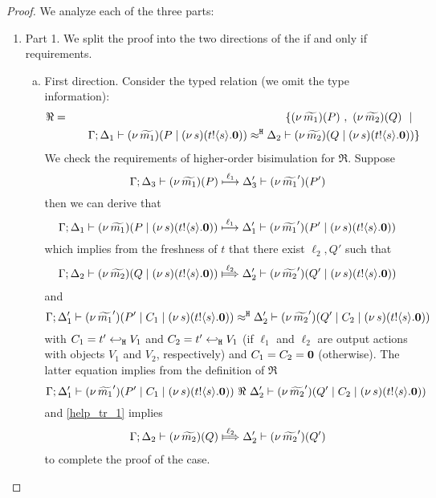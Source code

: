 \begin{proof}
We analyze each of the three parts:
\begin{enumerate}[$-$]
	\item Part 1. We split the proof into the two directions
	of the if and only if requirements.
	\begin{enumerate}[a)]
		\item	First direction. Consider the typed relation (we omit the type information):
				\begin{eqnarray*}
					\Re &=& \set{	\newsp{\widetilde{m_1}}{P}\ , \ 
									\newsp{\widetilde{m_2}}{Q} \setbar\\
					&&
									\quad \horel{\Gamma}{\Delta_1}{\newsp{\widetilde{m_1}}{P \Par \newsp{s}{\bout{t}{s} \inact}  } }
									{\hwb}
									{\Delta_2}{\newsp{\widetilde{m_2}}{Q \Par \newsp{s}{\bout{t}{s} \inact}  } }
					}
				\end{eqnarray*}
				We check the requirements of higher-order bisimulation
				for  $\Re$.
				Suppose
				\[
					\Gamma; \Delta_3 \vdash (\nu\, \widetilde{m_1})(P   )  \stackrel{\ell_1}{\longmapsto} \Delta_3' \vdash (\nu\, \widetilde{m_1}')(P')
				\]
				then we can derive that
				\[
					\Gamma; \Delta_1 \vdash (\nu\, \widetilde{m_1})(P \;|\; (\nu\, s)(t ! \langle s \rangle . \mathbf{0})  )  \stackrel{\ell_1}{\longmapsto} \Delta_1' \vdash (\nu\, \widetilde{m_1}')(P' \;|\; (\nu\, s)(t ! \langle s \rangle . \mathbf{0})  )
				\]
				which implies from the freshness of $t$ that there exist $\ell_2, Q'$ such that
				\begin{eqnarray}
					\horel{\Gamma}{\Delta_2}{\newsp{\widetilde{m_2}}{Q \Par \newsp{s}{\bout{t}{s} \inact}  } }
					{\Hby{\ell_2}}
					{\Delta_2'}{\newsp{\widetilde{m_2}'}{Q' \Par \newsp{s}{\bout{t}{s} \inact}  } }
					\label{help_tr_1}
				\end{eqnarray}
				and
				\[
					\Gamma; \Delta_1' \vdash (\nu\, \widetilde{m_1}')(P' \;|\; C_1 \;|\; (\nu\, s)(t ! \langle s \rangle . \mathbf{0})  )  \approx^\mathtt{H} \Delta_2' \vdash (\nu\, \widetilde{m_2}')(Q' \;|\; C_2 \;|\; (\nu\, s)(t ! \langle s \rangle . \mathbf{0})  )
				\]
				with $C_1 = t' \hookleftarrow_{\mathtt{H}} V_1$ and $C_2 = t' \hookleftarrow_{\mathtt{H}} V_1$ (if $\ell_1$ and $\ell_2$ are output actions
				with objects $V_1$ and $V_2$, respectively) and $C_1 = C_2 = \mathbf{0}$ (otherwise).
				The latter equation implies from the definition of $\Re$
				\[
					\Gamma; \Delta_1' \vdash (\nu\, \widetilde{m_1}')(P' \;|\; C_1 \;|\; (\nu\, s)(t ! \langle s \rangle . \mathbf{0})  )  \ \Re\  \Delta_2' \vdash (\nu\, \widetilde{m_2}')(Q' \;|\; C_2 \;|\; (\nu\, s)(t ! \langle s \rangle . \mathbf{0})  )
				\]
				and \eqref{help_tr_1} implies
				\begin{eqnarray*}
					\horel{\Gamma}{\Delta_2}{\newsp{\widetilde{m_2}}{Q } }
					{\Hby{\ell_2}}
					{\Delta_2'}{\newsp{\widetilde{m_2}'}{Q'} }
				\end{eqnarray*}
				to complete the proof of the case.


\end{enumerate}
\end{enumerate}
\end{proof}
